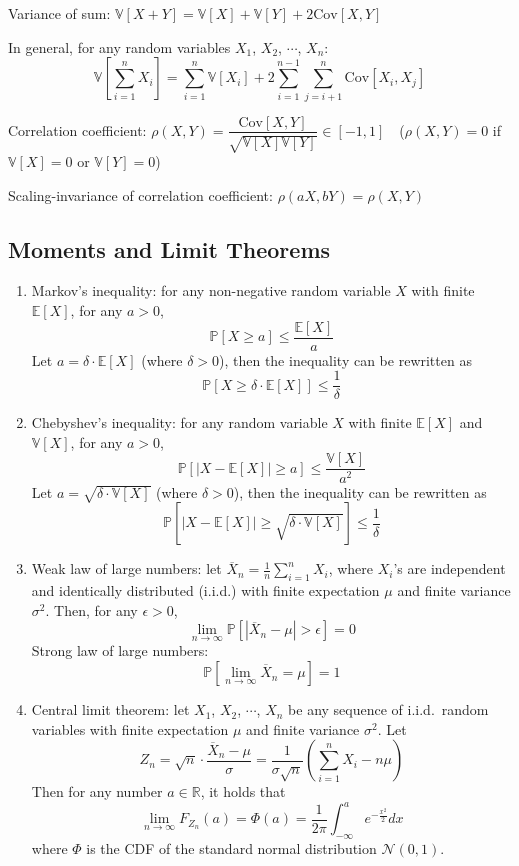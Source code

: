 \documentclass{article}
\begin{document}
\begin{enumerate}
		Variance of sum: $\mathbb{V}[X+Y]=\mathbb{V}[X]+\mathbb{V}[Y]+2\mathrm{Cov}[X,Y]$
		
		In general, for any random variables $X_1$, $X_2$, $\cdots$, $X_n$:
		$$\mathbb{V}\left[\sum_{i=1}^{n}X_i\right]=\sum_{i=1}^{n}\mathbb{V}[X_i]+2\sum_{i=1}^{n-1}\sum_{j=i+1}
		^{n}\mathrm{Cov}[X_i,X_j]$$
		
		Correlation coefficient: $\rho(X,Y)=\dfrac{\mathrm{Cov}[X,Y]}{\sqrt{\mathbb{V}[X]\mathbb{V}[Y]}}\in[-1,1]$\ \ ($\rho(X,Y)=0$ if $\mathbb{V}[X]=0$ or $\mathbb{V}[Y]=0$)
		
		Scaling-invariance of correlation coefficient: $\rho(aX,bY)=\rho(X,Y)$
	
\end{enumerate}

\subsection{Moments and Limit Theorems}

\begin{enumerate}
	\item Markov's inequality: for any non-negative random variable $X$ with finite $\mathbb{E}[X]$, for any $a>0$,
		$$\mathbb{P}[X\geq a]\leq\frac{\mathbb{E}[X]}{a}$$
		Let $a=\delta\cdot\mathbb{E}[X]$ (where $\delta>0$), then the inequality can be rewritten as
		$$\mathbb{P}[X\geq\delta\cdot\mathbb{E}[X]]\leq\frac{1}{\delta}$$
		
	\item Chebyshev's inequality: for any random variable $X$ with finite $\mathbb{E}[X]$ and $\mathbb{V}[X]$, for any $a>0$,
		$$\mathbb{P}[|X-\mathbb{E}[X]|\geq a]\leq\frac{\mathbb{V}[X]}{a^2}$$
		Let $a=\sqrt{\delta\cdot\mathbb{V}[X]}$ (where $\delta>0$), then the inequality can be rewritten as
		$$\mathbb{P}\left[|X-\mathbb{E}[X]|\geq\sqrt{\delta\cdot\mathbb{V}[X]}\right]\leq\frac{1}{\delta}$$
	
	\item Weak law of large numbers: let $\overline{X}_n=\frac{1}{n}\sum_{i=1}^{n}X_i$, where $X_i$'s are independent and identically distributed (i.i.d.) with finite expectation $\mu$ and finite variance $\sigma^2$. Then, for any $\epsilon>0$,
		$$\lim_{n\to\infty}\mathbb{P}\left[|\overline{X}_n-\mu|>\epsilon\right]=0$$
		Strong law of large numbers: 
		$$\mathbb{P}\left[\lim_{n\to\infty}\overline{X}_n=\mu\right]=1$$
		
	\item Central limit theorem: let $X_1$, $X_2$, $\cdots$, $X_n$ be any sequence of i.i.d.~random variables with finite expectation $\mu$ and finite variance $\sigma^2$. Let
		$$Z_n=\sqrt{n}\cdot\frac{\overline{X}_n-\mu}{\sigma}=\frac{1}{\sigma\sqrt{n}}\left(\sum_{i=1}^{n}X_i-n\mu\right)$$
		Then for any number $a\in\mathbb{R}$, it holds that 
		$$\lim_{n\to\infty}F_{Z_n}(a)=\Phi(a)=\frac{1}{2\pi}\int_{-\infty}^{a}e^{-\frac{x^2}{2}}dx$$
		where $\Phi$ is the CDF of the standard normal distribution $\mathcal{N}(0,1)$.
\end{enumerate}
\end{document}
